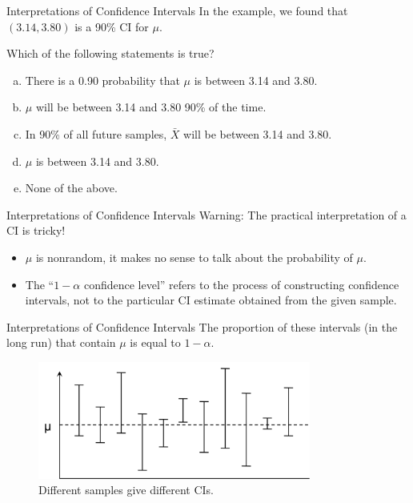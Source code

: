 \documentclass{beamer}
\begin{document}
\begin{frame}{Interpretations of Confidence Intervals}
In the example, we found that $(3.14, 3.80)$ is a 90\% CI for $\mu$. 

Which of the following statements is true?
\begin{enumerate}[(a)]
\item There is a 0.90 probability that $\mu$ is between 3.14 and 3.80.
\item $\mu$ will be between 3.14 and 3.80 90\% of the time.
\item In 90\% of all future samples, $\bar X$ will be between 3.14 and 3.80.
\item  $\mu$ is between 3.14 and 3.80.
\item None of the above.
\end{enumerate}
\end{frame}

\begin{frame}{Interpretations of Confidence Intervals}
\alert{Warning: The practical interpretation of a CI is tricky!}

\begin{itemize}
\item $\mu$ is nonrandom, it makes no sense to talk about the probability of $\mu$.
\item The ``$1-\alpha$ confidence level'' refers to the process of constructing confidence intervals, not to the particular CI estimate obtained from the given sample.
\end{itemize}
\end{frame}

\begin{frame}{Interpretations of Confidence Intervals}
The proportion of these intervals (in the long run) that contain $\mu$ is equal to $1-\alpha$.
\begin{figure}\caption{Different samples give different CIs.}
    \includegraphics[width=0.8\textwidth]{figures/CI.png}
\end{figure}
\end{frame}
\end{document}
